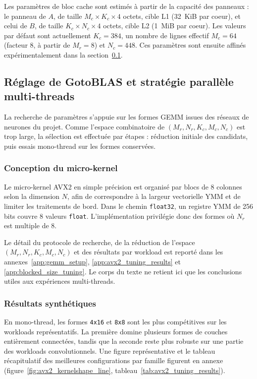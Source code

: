 \documentclass[a4paper,11pt,oneside]{article}
\begin{document}
Les paramètres de bloc cache sont estimés à partir de la capacité des panneaux : le panneau de $A$, de taille $M_c \times K_c \times 4$ octets, cible L1 (32~KiB par coeur), et celui de $B$, de taille $K_c \times N_c \times 4$ octets, cible L2 (1~MiB par coeur). Les valeurs par défaut sont actuellement $K_c=384$, un nombre de lignes effectif $M_c=64$ (facteur 8, à partir de $M_r=8$) et $N_c=448$. Ces paramètres sont ensuite affinés expérimentalement dans la section~\ref{sec:avx2_tuning}.

\subsection{Réglage de GotoBLAS et stratégie parallèle multi-threads}\label{sec:avx2_tuning}

La recherche de paramètres s'appuie sur les formes GEMM issues des réseaux de neurones du projet. Comme l'espace combinatoire de $(M_r,N_r,K_c,M_c,N_c)$ est trop large, la sélection est effectuée par étapes : réduction initiale des candidats, puis essais mono-thread sur les formes conservées.

\subsubsection{Conception du micro-kernel}\label{subsec:microkernel}

Le micro-kernel AVX2 en simple précision est organisé par blocs de 8 colonnes selon la dimension $N$, afin de correspondre à la largeur vectorielle YMM et de limiter les traitements de bord. Dans le chemin \texttt{float32}, un registre YMM de 256 bits couvre 8 valeurs \texttt{float}. L'implémentation privilégie donc des formes où $N_r$ est multiple de 8.

Le détail du protocole de recherche, de la réduction de l'espace $(M_r,N_r,K_c,M_c,N_c)$ et des résultats par workload est reporté dans les annexes~\ref{app:gemm_setup}, \ref{app:avx2_tuning_results} et \ref{app:blocked_size_tuning}. Le corps du texte ne retient ici que les conclusions utiles aux expériences multi-threads.

\subsubsection{Résultats synthétiques}

En mono-thread, les formes \texttt{4x16} et \texttt{8x8} sont les plus compétitives sur les workloads représentatifs. La première domine plusieurs formes de couches entièrement connectées, tandis que la seconde reste plus robuste sur une partie des workloads convolutionnels. Une figure représentative et le tableau récapitulatif des meilleures configurations par famille figurent en annexe (figure~\ref{fig:avx2_kernelshape_line}, tableau~\ref{tab:avx2_tuning_results}).
\end{document}

